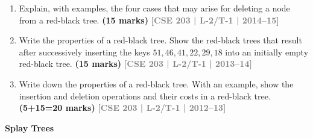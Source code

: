 \documentclass[12pt,a3paper]{article}
\newcommand{\yr}[1]{\hfill\textcolor{gray}{\small\textbf{[#1]}}}
\newcommand{\mk}[1]{\textcolor{orange!70!black}{\small\textbf{(#1 marks)}}}
\newcommand{\subtopic}[2]{%
  \vspace{10pt}
  \noindent\begin{tcolorbox}[colback=#1!8,colframe=#1,boxrule=0.6pt,arc=4pt,
    left=6pt,right=6pt,top=4pt,bottom=4pt]
    \small\bfseries\textcolor{#1}{#2}
  \end{tcolorbox}
  \vspace{2pt}
}
\begin{document}
\begin{enumerate}
\item Explain, with examples, the four cases that may arise for deleting a node from a red-black tree. \mk{15}
\yr{CSE 203 | L-2/T-1 | 2014--15}


\item Write the properties of a red-black tree. Show the red-black trees that result after successively inserting the keys $51, 46, 41, 22, 29, 18$ into an initially empty red-black tree. \mk{15}
\yr{CSE 203 | L-2/T-1 | 2013--14}

\item Write down the properties of a red-black tree. With an example, show the insertion and deletion operations and their costs in a red-black tree. \mk{5+15=20}
\yr{CSE 203 | L-2/T-1 | 2012--13}



\end{enumerate}

\subtopic{cB}{Splay Trees}
\label{sub:s2-splay}
\end{document}
